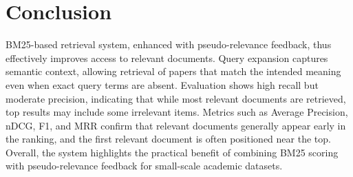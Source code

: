 \documentclass[a4paper,12pt]{article}
\begin{document}
\section{Conclusion}
BM25-based retrieval system, enhanced with pseudo-relevance feedback, thus effectively improves access to relevant documents. Query expansion captures semantic context, allowing retrieval of papers that match the intended meaning even when exact query terms are absent. Evaluation shows high recall but moderate precision, indicating that while most relevant documents are retrieved, top results may include some irrelevant items. Metrics such as Average Precision, nDCG, F1, and MRR confirm that relevant documents generally appear early in the ranking, and the first relevant document is often positioned near the top. Overall, the system highlights the practical benefit of combining BM25 scoring with pseudo-relevance feedback for small-scale academic datasets.
\end{document}

